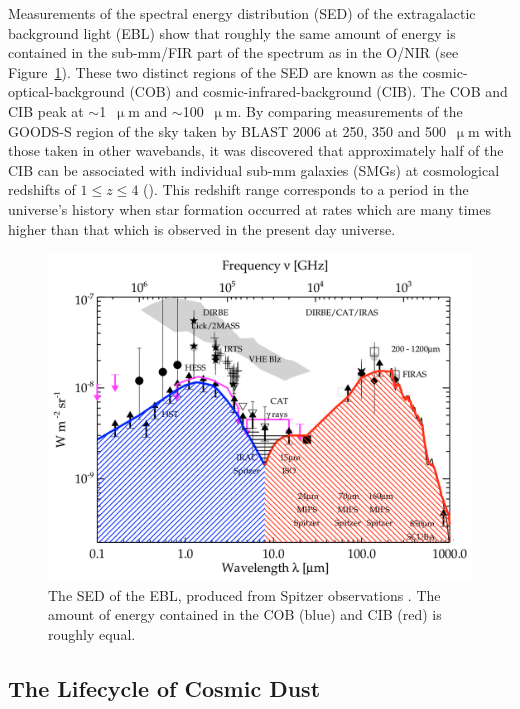  Measurements of the spectral energy distribution (SED) of the extragalactic background light (EBL) show that roughly the same amount of energy is contained in the sub-mm/FIR part of the spectrum as in the O/NIR (see Figure~\ref{fig:EBL}). These two distinct regions of the SED are known as the cosmic-optical-background (COB) and cosmic-infrared-background (CIB). The COB and CIB peak at $\sim$1~$\upmu$m and $\sim$100~$\upmu$m. By comparing measurements of the GOODS-S region of the sky taken by BLAST 2006 at 250, 350 and 500~$\upmu$m with those taken in other wavebands, it was discovered that approximately half of the CIB can be associated with individual sub-mm galaxies (SMGs) at cosmological redshifts of $1 \leq z \leq 4$ (\citet{devlin2009over,marsden2009blast,pascale2009blast}). This redshift range corresponds to a period in the universe's history when star formation occurred at rates which are many times higher than that which is observed in the present day universe.

\begin{figure}[!htbp]
\centering
\includegraphics[width=\textwidth]{figures/intro/cob_cib}
\caption[~The SED of extragalactic background light.]{The SED of the EBL, produced from Spitzer observations \citep{dole2006cosmic}. The amount of energy contained in the COB (blue) and CIB (red) is roughly equal.}
\label{fig:EBL}
\end{figure}

\subsection{The Lifecycle of Cosmic Dust}

